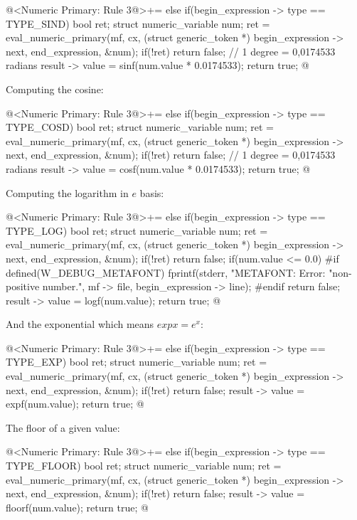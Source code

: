 \iniciocodigo
@<Numeric Primary: Rule 3@>+=
else if(begin_expression -> type == TYPE_SIND){
  bool ret;
  struct numeric_variable num;
  ret = eval_numeric_primary(mf, cx, (struct generic_token *)
                             begin_expression -> next,
                             end_expression, &num);
  if(!ret)
    return false;
  // 1 degree = 0,0174533 radians
  result -> value = sinf(num.value * 0.0174533);
  return true;
}
@
\fimcodigo

Computing the cosine:

\iniciocodigo
@<Numeric Primary: Rule 3@>+=
else if(begin_expression -> type == TYPE_COSD){
  bool ret;
  struct numeric_variable num;
  ret = eval_numeric_primary(mf, cx, (struct generic_token *)
                             begin_expression -> next,
                             end_expression, &num);
  if(!ret)
    return false;
  // 1 degree = 0,0174533 radians
  result -> value = cosf(num.value * 0.0174533);
  return true;
}
@
\fimcodigo

Computing the logarithm in $e$ basis:

\iniciocodigo
@<Numeric Primary: Rule 3@>+=
else if(begin_expression -> type == TYPE_LOG){
  bool ret;
  struct numeric_variable num;
  ret = eval_numeric_primary(mf, cx, (struct generic_token *)
                             begin_expression -> next,
                             end_expression, &num);
  if(!ret)
    return false;
  if(num.value <= 0.0){
#if defined(W_DEBUG_METAFONT)
    fprintf(stderr, "METAFONT: Error: %
            "non-positive number.\n", mf -> file,
            begin_expression -> line);
#endif
    return false;
  }
  result -> value = logf(num.value);
  return true;
}
@
\fimcodigo

And the exponential which means $exp x = e^x$:

\iniciocodigo
@<Numeric Primary: Rule 3@>+=
else if(begin_expression -> type == TYPE_EXP){
  bool ret;
  struct numeric_variable num;
  ret = eval_numeric_primary(mf, cx, (struct generic_token *)
                             begin_expression -> next,
                             end_expression, &num);
  if(!ret)
    return false;
  result -> value = expf(num.value);
  return true;
}
@
\fimcodigo

The floor of a given value:

\iniciocodigo
@<Numeric Primary: Rule 3@>+=
else if(begin_expression -> type == TYPE_FLOOR){
  bool ret;
  struct numeric_variable num;
  ret = eval_numeric_primary(mf, cx, (struct generic_token *)
                             begin_expression -> next,
                             end_expression, &num);
  if(!ret)
    return false;
  result -> value = floorf(num.value);
  return true;
}
@
\fimcodigo

